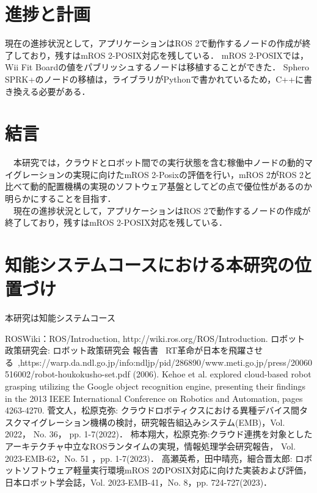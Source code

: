 \documentclass[11pt]{ujarticle}
\begin{document}
\section{進捗と計画}
現在の進捗状況として，アプリケーションはROS 2で動作するノードの作成が終了しており，残すはmROS 2-POSIX対応を残している．
mROS 2-POSIXでは，Wii Fit Boardの値をパブリッシュするノードは移植することができた．
Sphero SPRK+のノードの移植は，ライブラリがPythonで書かれているため，C++に書き換える必要がある．

\section{結言}
　本研究では，クラウドとロボット間での実行状態を含む稼働中ノードの動的マイグレーションの実現に向けたmROS 2-Posixの評価を行い，mROS 2がROS 2と比べて動的配置機構の実現のソフトウェア基盤としてどの点で優位性があるのか明らかにすることを目指す．
\\　現在の進捗状況として，アプリケーションはROS 2で動作するノードの作成が終了しており，残すはmROS 2-POSIX対応を残している．

\section{知能システムコースにおける本研究の位置づけ}
 本研究は知能システムコース


\begin{thebibliography}{99}
	ROSWiki：ROS/Introduction, http://wiki.ros.org/ROS/Introduction.
	ロボット政策研究会: ロボット政策研究会 報告書 ~RT革命が日本を飛躍させる~,https://warp.da.ndl.go.jp/info:ndljp/pid/286890/www.meti.go.jp/press/20060516002/robot-houkokusho-set.pdf (2006).
	Kehoe et al. explored cloud-based robot grasping utilizing the Google object recognition engine, presenting their findings in the 2013 IEEE International Conference on Robotics and Automation, pages 4263-4270.
	菅文人，松原克弥: クラウドロボティクスにおける異種デバイス間タスクマイグレーション機構の検討，研究報告組込みシステム(EMB)，Vol. 2022， No. 36， pp. 1-7(2022)．
	柿本翔大，松原克弥:クラウド連携を対象としたアーキテクチャ中立なROSランタイムの実現，情報処理学会研究報告， Vol. 2023-EMB-62，No. 51 ，pp. 1-7(2023)．
	高瀬英希，田中晴亮，細合晋太郎: ロボットソフトウェア軽量実行環境mROS 2のPOSIX対応に向けた実装および評価，日本ロボット学会誌，Vol. 2023-EMB-41，No. 8，pp. 724-727(2023)．
\end{thebibliography}
\end{document}
